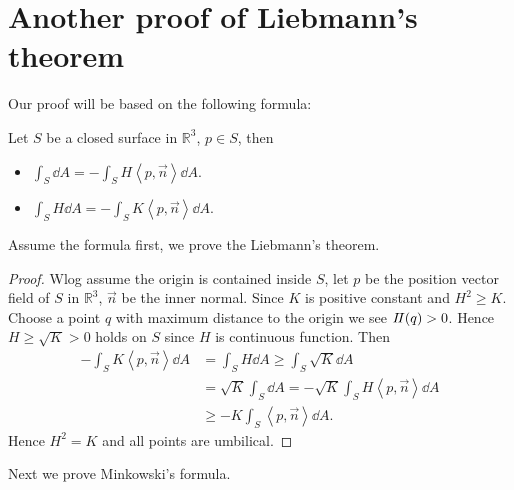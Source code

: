 \section{Another proof of Liebmann's theorem}
Our proof will be based on the following formula:
\begin{theorem}
    Let \(S\) be a closed surface in \(\mathbb{R}^3\), \(p\in S\), then
    \begin{itemize}
    \item \(\int_{S}\dd{A}=-\int_{S}H\left<p,\vec{n}\right> \dd{A}\).
    \item \(\int_{S}H\dd{A}=-\int_{S}K\left<p,\vec{n}\right> \dd{A}\).
    \end{itemize}
\end{theorem}
Assume the formula first, we prove the Liebmann's theorem.
\begin{proof}
    Wlog assume the origin is contained inside \(S\), let \(p\) be the position vector
    field of \(S\) in \(\mathbb{R}^3\), \(\vec{n}\) be the inner normal. Since \(K\)
    is positive constant and \(H^2\ge K\). Choose a point \(q\) with maximum distance
    to the origin we see \(I\!I(q)>0\). Hence \(H\ge \sqrt{K}>0\) holds on \(S\) since
    \(H\) is continuous function. Then
    \begin{align*}
        -\int_{S}K\left<p,\vec{n}\right> \dd{A}&=\int_{S}H\dd{A}
        \ge \int_{S}\sqrt{K}\dd{A} \\
        &=\sqrt{K}\int_{S}\dd{A}=-\sqrt{K}\int_{S}H\left<p,\vec{n}\right> \dd{A} \\
        &\ge-K\int_{S}\left<p,\vec{n}\right> \dd{A}
    .\end{align*}
    Hence \(H^2=K\) and all points are umbilical.
\end{proof} 
Next we prove Minkowski's formula.
